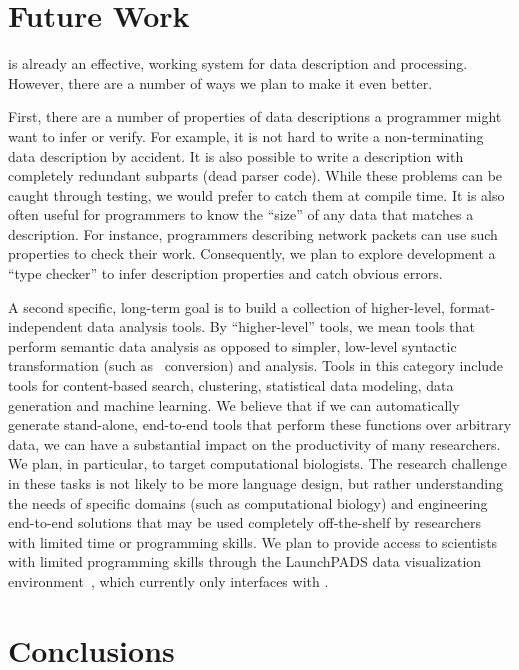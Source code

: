 \section{Future Work}
\label{sec:future}

\padsml{} is already an effective, working system for data description
and processing.  However, there are a number of ways we plan to make it 
even better.

First, there are a number of properties of data descriptions
a programmer might want to infer or verify.  For example, it is not hard to
write a non-terminating data description by accident.  It
is also possible to write a description with completely redundant
subparts (dead parser code).  While these problems can be caught 
through testing,
we would prefer to catch them at compile time.  It is also often useful
for programmers to know the ``size'' of any data that matches 
a description.  For instance, programmers describing network packets can use
such properties to check
their work. Consequently,
we plan to explore development a \padsml{} ``type checker'' 
to infer description properties and catch obvious errors.

A second specific, long-term goal is to build a collection of
higher-level, format-independent data analysis tools.  By
``higher-level'' tools, we mean tools that perform semantic data
analysis as opposed to simpler, low-level syntactic transformation
(such as \xml\ conversion) and analysis.  
Tools in this category include tools for
content-based search, clustering, statistical data modeling, data 
generation and machine learning.  We believe that if we can automatically
generate stand-alone,
end-to-end tools that perform these functions over arbitrary data, 
we can have a substantial impact on the
productivity of many researchers.  We plan, in particular,  
to target computational biologists.  The research challenge
in these tasks is not likely to be more language design, but rather
understanding the needs of specific domains 
(such as computational biology) and engineering end-to-end solutions
that may be used completely off-the-shelf
by researchers with limited time or programming skills.  We plan
to provide access to scientists with limited programming skills
through the LaunchPADS data visualization 
environment~\cite{launchpads:planx,launchpads:sigmod}, which currently
only interfaces with \padsc{}.

\section{Conclusions}
\label{sec:conc}

